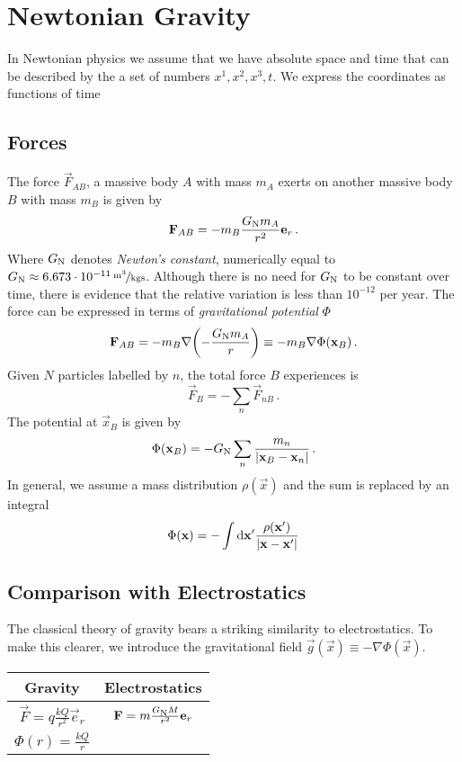 \chapter{Newtonian Gravity}
In Newtonian physics we assume that we have absolute space and time that can be described by the a set of numbers $x^1,x^2,x^3,t$. We express the coordinates as functions of time
\section{Forces}
The force $\vec{F}_{AB}$, a massive body $A$ with mass $m_A$ exerts on another massive body $B$ with mass $m_B$ is given by
\begin{equation}
    \vec{F}_{AB}=-m_B\frac{G\textsubscript{N}m_A}{r^2}\vec{e}_r\, .
\end{equation}
Where $G\textsubscript{N}$ denotes \emph{Newton's constant}, numerically equal
to $G\textsubscript{N}\approx \unitfrac[6.673\cdot 10^{-11}]{m^3}{kgs}$. Although there is no need for $G\textsubscript{N}$ to be constant over time, there is evidence that the relative variation is less than $10^{-12}$ per year. The force can be expressed in terms of \emph{gravitational potential} $\Phi$
\begin{equation}
    \vec{F}_{AB}=-m_B\nabla\left(-\frac{G\textsubscript{N}m_A}{r}\right)\equiv -m_B\nabla\Phi(\vec{x}_B)\, .
\end{equation}
Given $N$ particles labelled by $n$, the total force $B$ experiences is
\begin{equation}
    \vec{F}_{B}=-\sum_n \vec{F}_{nB}\, .
\end{equation}
The potential at $\vec{x}_B$ is given by
\begin{equation}
    \Phi(\vec{x}_B)=-G\textsubscript{N}\sum_n\frac{m_n}{|\vec{x}_B-\vec{x}_n|}\, .
\end{equation}
In general, we assume a mass distribution $\rho(\vec{x})$ and the sum is replaced by an integral
\begin{equation}
    \Phi(\vec{x})=-\int\dif{\vec{x}^{\prime}}\frac{\rho(\vec{x}^{\prime})}{|\vec{x}-\vec{x}^{\prime}|}
\end{equation}
\section{Comparison with Electrostatics}
The classical theory of gravity bears a striking similarity to electrostatics. To make this clearer, we introduce the gravitational field $\vec{g}(\vec{x})\equiv -\nabla\Phi(\vec{x})$.
\begin{table}
    \centering
    \begin{tabular}{cc}
        \toprule
        Gravity&Electrostatics\\
        \midrule
        $\displaystyle\vec{F}=q\frac{kQ}{r^2}\vec{e}_r$&$\vec{F}=m\frac{G\textsubscript{N}M}{r^2}\vec{e}_r$\\
        $\Phi(r)=\frac{kQ}{r}$&\\
        \bottomrule
    \end{tabular}
\end{table}
